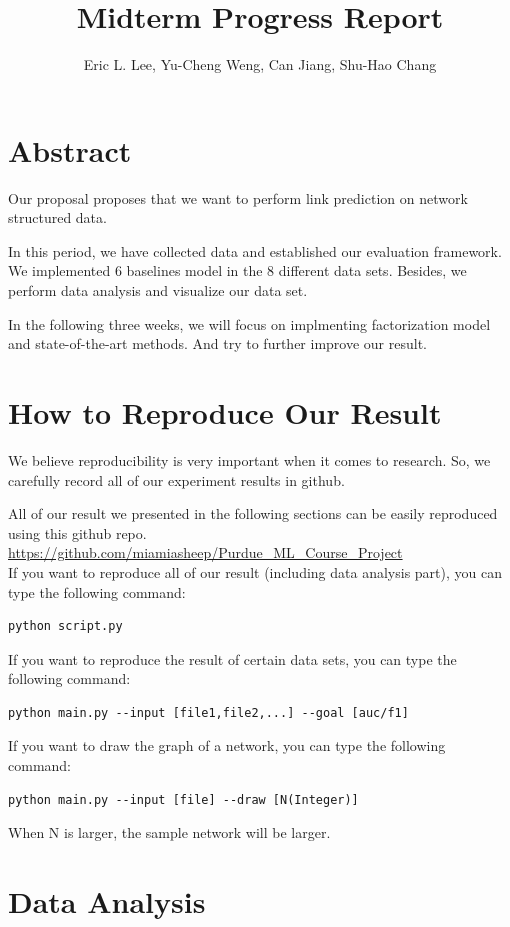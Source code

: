 \documentclass[12pt]{article}
\begin{document}
 
\title{Midterm Progress Report}
\author{Eric L. Lee, Yu-Cheng Weng, Can Jiang, Shu-Hao Chang} 
\maketitle

\section{Abstract}
Our proposal proposes that we want to perform link prediction on network structured data.

In this period, we have collected data and established our evaluation framework. We implemented 6 baselines model in the 8 different data sets. Besides, we perform data analysis and visualize our data set.

In the following three weeks, we will focus on implmenting factorization model and state-of-the-art methods. And try to further improve our result. 

\section{How to Reproduce Our Result}
We believe reproducibility is very important when it comes to research. So, we carefully record all of our experiment results in github.

All of our result we presented in the following sections can be easily reproduced using this github repo. \\

\url{https://github.com/miamiasheep/Purdue\_ML\_Course\_Project}
\\
If you want to reproduce all of our result (including data analysis part), you can type the following command: 
\begin{lstlisting}
python script.py
\end{lstlisting}
If you want to reproduce the result of certain data sets, you can type the following command:
\begin{lstlisting}
python main.py --input [file1,file2,...] --goal [auc/f1]
\end{lstlisting}
If you want to draw the graph of a network, you can type the following command:
\begin{lstlisting}
python main.py --input [file] --draw [N(Integer)]
\end{lstlisting}
When N is larger, the sample network will be larger.

\section{Data Analysis}
\end{document}
